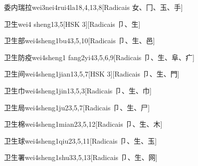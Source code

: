 \begin{entry}{委内瑞拉}{wei3nei4rui4la1}{8,4,13,8}[Radicais ⼥、⼌、⽟、⼿]
\end{entry}

\begin{entry}{卫生}{wei4 sheng1}{3,5}[HSK 3][Radicais ⼙、⽣]
\end{entry}

\begin{entry}{卫生部}{wei4sheng1bu4}{3,5,10}[Radicais ⼙、⽣、⾢]
\end{entry}

\begin{entry}{卫生防疫}{wei4sheng1 fang2yi4}{3,5,6,9}[Radicais ⼙、⽣、⾩、⽧]
\end{entry}

\begin{entry}{卫生间}{wei4sheng1jian1}{3,5,7}[HSK 3][Radicais ⼙、⽣、⾨]
\end{entry}

\begin{entry}{卫生巾}{wei4sheng1jin1}{3,5,3}[Radicais ⼙、⽣、⼱]
\end{entry}

\begin{entry}{卫生局}{wei4sheng1ju2}{3,5,7}[Radicais ⼙、⽣、⼫]
\end{entry}

\begin{entry}{卫生棉}{wei4sheng1mian2}{3,5,12}[Radicais ⼙、⽣、⽊]
\end{entry}

\begin{entry}{卫生球}{wei4sheng1qiu2}{3,5,11}[Radicais ⼙、⽣、⽟]
\end{entry}

\begin{entry}{卫生署}{wei4sheng1shu3}{3,5,13}[Radicais ⼙、⽣、⽹]
\end{entry}

